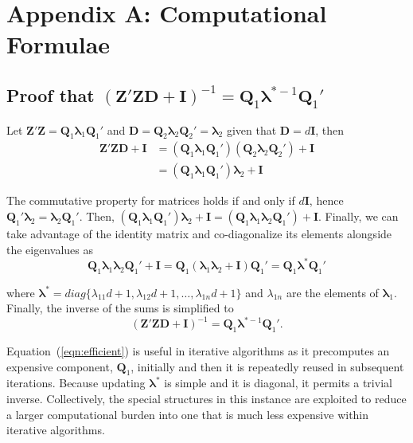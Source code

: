 \documentclass[12pt]{article}
\begin{document}
\newpage
\section*{Appendix A: Computational Formulae}

\subsection*{Proof that $(\bm{Z}'\bm{Z}\bm{D} + \bm{I})^{-1} = \bm{Q}_1 \bm{\lambda}^{*-1} \bm{Q}_1'$}

Let $\bm{Z}'\bm{Z} = \bm{Q}_1 \bm{\lambda}_1 \bm{Q}_1'$ and $\bm{D}=\bm{Q}_2 \bm{\lambda}_2 \bm{Q}_2'= \bm{\lambda}_2$ given that $\bm{D}=d\bm{I}$, then
\begin{align}
\bm{Z}'\bm{Z}\bm{D} + \bm{I} & = (\bm{Q}_1 \bm{\lambda}_1 \bm{Q}_1')(\bm{Q}_2 \bm{\lambda}_2 \bm{Q}_2') + \bm{I}\\
		& = (\bm{Q}_1 \bm{\lambda}_1 \bm{Q}_1')\bm{\lambda}_2 + \bm{I}
\end{align}

The commutative property for matrices holds if and only if $d\bm{I}$, hence $\bm{Q}_1'\bm{\lambda}_2 = \bm{\lambda}_2\bm{Q}_1'$. Then, $(\bm{Q}_1 \bm{\lambda}_1 \bm{Q}_1')\bm{\lambda}_2 + \bm{I} = (\bm{Q}_1 \bm{\lambda}_1\bm{\lambda}_2 \bm{Q}_1') + \bm{I}$. Finally, we can take advantage of the identity matrix and co-diagonalize its elements alongside the eigenvalues as		
\begin{equation}
\bm{Q}_1 \bm{\lambda}_1\bm{\lambda}_2 \bm{Q}_1' + \bm{I} = \bm{Q}_1 (\bm{\lambda}_1\bm{\lambda}_2+ \bm{I}) \bm{Q}_1' = \bm{Q}_1 \bm{\lambda}^* \bm{Q}_1'
\end{equation}
		
\noindent where $\bm{\lambda}^* = diag\{\lambda_{11}d+1, \lambda_{12}d+1, \ldots, \lambda_{1n}d+1\}$ and $\lambda_{1n}$ are the elements of $\bm{\lambda}_1$. Finally, the inverse of the sums is simplified to
\begin{equation}
\label{eqn:efficient}
(\bm{Z}'\bm{Z}\bm{D} + \bm{I})^{-1} = \bm{Q}_1 \bm{\lambda}^{*-1} \bm{Q}_1'.
\end{equation}

Equation~(\ref{eqn:efficient}) is useful in iterative algorithms as it precomputes an expensive component, $\bm{Q}_1$, initially and then it is repeatedly reused in subsequent iterations. Because updating $\bm{\lambda}^*$ is simple and it is diagonal, it permits a trivial inverse. Collectively, the special structures in this instance are exploited to reduce a larger computational burden into one that is much less expensive within iterative algorithms.
\end{document}
